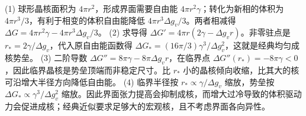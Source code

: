 (1) 球形晶核面积为 \(4\pi r^2\)，形成界面需要自由能 \(4\pi r^2\gamma\)；转化为新相的体积为 \(4\pi r^3/3\)，有利于相变的体积自由能降低 \(4\pi r^3\Delta g_v/3\)。两者相减得 \(\Delta G=4\pi r^2\gamma-4\pi r^3\Delta g_v/3\)。
(2) 求导得 \(\Delta G'=4\pi r(2\gamma-\Delta g_vr)\)。非零驻点是 \(r_*=2\gamma/\Delta g_v\)，代入原自由能函数得 \(\Delta G_*=(16\pi/3)\gamma^3/\Delta g_v^2\)，这就是经典均匀成核势垒。
(3) 二阶导数 \(\Delta G''=8\pi\gamma-8\pi\Delta g_vr\)，在临界点 \(\Delta G''(r_*)=-8\pi\gamma<0\)，因此临界晶核是势垒顶端而非稳定尺寸。比 \(r_*\) 小的晶核倾向收缩，比其大的核可沿增大半径方向降低自由能。
(4) 临界半径按 \(r_*\propto\gamma/\Delta g_v\) 缩放，势垒按 \(\Delta G_*\propto\gamma^3/\Delta g_v^2\) 缩放。因此界面张力提高会抑制成核，而增大过冷导致的体积驱动力会促进成核；经典近似要求足够大的宏观核，且不考虑界面各向异性。
